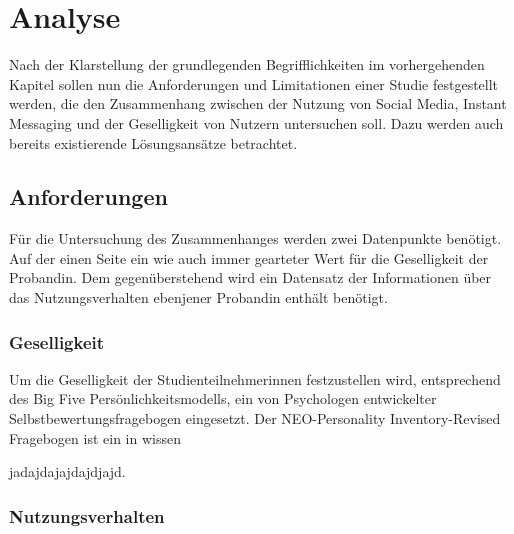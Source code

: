 
\chapter{Analyse}
\label{ch:Analyse}

Nach der Klarstellung der grundlegenden Begrifflichkeiten im vorhergehenden Kapitel
sollen nun die Anforderungen und Limitationen einer Studie festgestellt werden, die den
Zusammenhang zwischen der Nutzung von Social Media, Instant Messaging und der Geselligkeit
von Nutzern untersuchen soll. 
Dazu werden auch bereits existierende Lösungsansätze betrachtet. 

\section{Anforderungen}
\label{ch:Analyse:sec:Anforderungen}


Für die Untersuchung des Zusammenhanges werden zwei Datenpunkte benötigt.
Auf der einen Seite ein wie auch immer gearteter Wert für die Geselligkeit der Probandin. 
Dem gegenüberstehend wird ein Datensatz der Informationen über das Nutzungsverhalten ebenjener Probandin enthält benötigt.
\par

\subsection{Geselligkeit}

Um die Geselligkeit der Studienteilnehmerinnen festzustellen wird, entsprechend des Big Five Persönlichkeitsmodells, ein von Psychologen entwickelter Selbstbewertungsfragebogen eingesetzt.
Der NEO-Personality Inventory-Revised Fragebogen ist ein in wissen

jadajdajajdajdjajd.

\subsection{Nutzungsverhalten}

